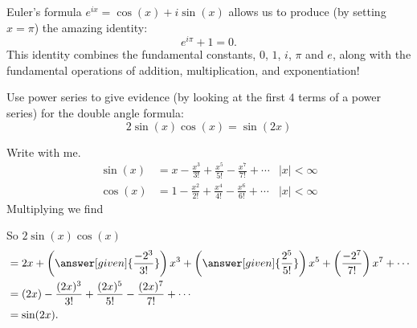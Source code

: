 \documentclass{ximera}
\begin{document}
Euler's formula $e^{ix} = \cos(x) + i \sin(x)$ allows us to produce
(by setting $x=\pi$) the amazing identity:
\[
e^{i \pi } + 1 = 0.
\]
This identity combines the fundamental constants, $0$, $1$, $i$,
$\pi$ and $e$, along with the fundamental operations of addition,
multiplication, and exponentiation!

\begin{example}
  Use power series to give evidence (by looking at the first $4$ terms
  of a power series) for the double angle formula:
  \[
  2\sin(x) \cos(x) = \sin(2x)
  \]
  \begin{explanation}
    Write with me.
    \begin{align*}
      \sin(x) &= x - \frac{x^3}{3!} + \frac{x^5}{5!} -\frac{x^7}{7!} + \cdots &|x|< \infty\\
      \cos(x) &= 1-\frac{x^2}{2!} + \frac{x^4}{4!} -\frac{x^6}{6!} + \cdots &|x|< \infty
    \end{align*}
    Multiplying we find
    \begin{image}
    \end{image}
    So $2\sin(x)\cos(x)$
    \begin{align*}
      &= 2x + \left(\answer[given]{\frac{-2^3}{3!}}\right)x^3 + \left(\answer[given]{\frac{2^5}{5!}}\right)x^5+\left(\frac{-2^7}{7!}\right)x^7 +\cdots\\
      &= (2x) -\frac{(2x)^3}{3!} + \frac{(2x)^5}{5!}-\frac{(2x)^7}{7!} +\cdots\\
      &= \sin(2x).
    \end{align*}
  \end{explanation}
\end{example}
\end{document}
